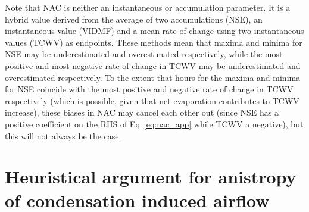Note that \ac{NAC} is neither an instantaneous or accumulation parameter. It is a hybrid value derived from the average of two accumulations (\ac{NSE}), an instantaneous value (\ac{VIDMF}) and a mean rate of change using two instantaneous values (\ac{TCWV}) as endpoints. These methods mean that maxima and minima for \ac{NSE} may be underestimated and overestimated respectively, while the most positive and most negative rate of change in \ac{TCWV} may be underestimated and overestimated respectively. To the extent that hours for the maxima and minima for \ac{NSE} coincide with the most positive and negative rate of change in \ac{TCWV} respectively (which is possible, given that net evaporation contributes to \ac{TCWV} increase), these biases in \ac{NAC} may cancel each other out (since \ac{NSE} has a positive coefficient on the RHS of Eq~\ref{eq:nac_app} while \ac{TCWV} a negative), but this will not always be the case.

\section{Heuristical argument for anistropy of condensation induced airflow}
\label{sec:anis_cond}

